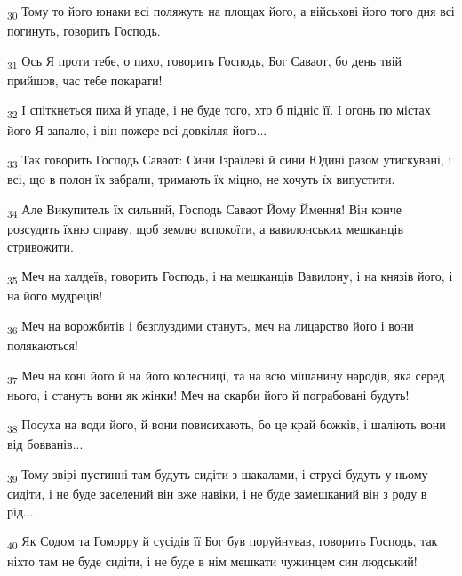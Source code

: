 \begin{tcolorbox}
\textsubscript{30} Тому то його юнаки всі поляжуть на площах його, а військові його того дня всі погинуть, говорить Господь.
\end{tcolorbox}
\begin{tcolorbox}
\textsubscript{31} Ось Я проти тебе, о пихо, говорить Господь, Бог Саваот, бо день твій прийшов, час тебе покарати!
\end{tcolorbox}
\begin{tcolorbox}
\textsubscript{32} І спіткнеться пиха й упаде, і не буде того, хто б підніс її. І огонь по містах його Я запалю, і він пожере всі довкілля його...
\end{tcolorbox}
\begin{tcolorbox}
\textsubscript{33} Так говорить Господь Саваот: Сини Ізраїлеві й сини Юдині разом утискувані, і всі, що в полон їх забрали, тримають їх міцно, не хочуть їх випустити.
\end{tcolorbox}
\begin{tcolorbox}
\textsubscript{34} Але Викупитель їх сильний, Господь Саваот Йому Ймення! Він конче розсудить їхню справу, щоб землю вспокоїти, а вавилонських мешканців стривожити.
\end{tcolorbox}
\begin{tcolorbox}
\textsubscript{35} Меч на халдеїв, говорить Господь, і на мешканців Вавилону, і на князів його, і на його мудреців!
\end{tcolorbox}
\begin{tcolorbox}
\textsubscript{36} Меч на ворожбитів і безглуздими стануть, меч на лицарство його і вони полякаються!
\end{tcolorbox}
\begin{tcolorbox}
\textsubscript{37} Меч на коні його й на його колесниці, та на всю мішанину народів, яка серед нього, і стануть вони як жінки! Меч на скарби його й пограбовані будуть!
\end{tcolorbox}
\begin{tcolorbox}
\textsubscript{38} Посуха на води його, й вони повисихають, бо це край божків, і шаліють вони від бовванів...
\end{tcolorbox}
\begin{tcolorbox}
\textsubscript{39} Тому звірі пустинні там будуть сидіти з шакалами, і струсі будуть у ньому сидіти, і не буде заселений він вже навіки, і не буде замешканий він з роду в рід...
\end{tcolorbox}
\begin{tcolorbox}
\textsubscript{40} Як Содом та Гоморру й сусідів її Бог був поруйнував, говорить Господь, так ніхто там не буде сидіти, і не буде в нім мешкати чужинцем син людський!
\end{tcolorbox}

